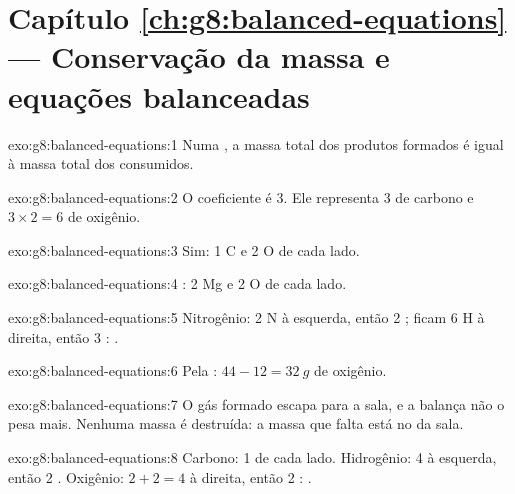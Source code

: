 \section*{Capítulo \ref{ch:g8:balanced-equations} --- Conservação da massa e equações balanceadas}

\begin{solution}{exo:g8:balanced-equations:1}
Numa , a massa total dos produtos formados é igual à massa
total dos  consumidos.
\end{solution}

\begin{solution}{exo:g8:balanced-equations:2}
O coeficiente é 3. Ele representa 3  de carbono e $3 \times 2 = 6$
 de oxigênio.
\end{solution}

\begin{solution}{exo:g8:balanced-equations:3}
Sim: 1 C e 2 O de cada lado.
\end{solution}

\begin{solution}{exo:g8:balanced-equations:4}
: 2 Mg e 2 O de cada lado.
\end{solution}

\begin{solution}{exo:g8:balanced-equations:5}
Nitrogênio: 2 N à esquerda, então 2 ; ficam 6 H à direita, então
3 : .
\end{solution}

\begin{solution}{exo:g8:balanced-equations:6}
Pela : $44 - 12 = \qty{32}{g}$ de oxigênio.
\end{solution}

\begin{solution}{exo:g8:balanced-equations:7}
O gás formado escapa para a sala, e a balança não o pesa mais. Nenhuma
massa é destruída: a massa que falta está no  da sala.
\end{solution}

\begin{solution}{exo:g8:balanced-equations:8}
Carbono: 1 de cada lado. Hidrogênio: 4 à esquerda, então 2 .
Oxigênio: $2 + 2 = 4$ à direita, então 2 :
.
\end{solution}

